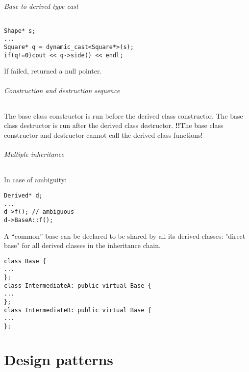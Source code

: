 \documentclass{article}
\newcommand{\caut}{\textbf{!!}}
\begin{document}
\paragraph{Base to derived type cast}
\begin{lstlisting}
Shape* s;
...
Square* q = dynamic_cast<Square*>(s);
if(q!=0)cout << q->side() << endl;
\end{lstlisting}
If failed, returned a null pointer.

\paragraph{Construction and destruction sequence}
The base class constructor is run
before the derived class constructor.
The base class destructor is run
after the derived class destructor.
\caut The base class constructor and destructor
cannot call the derived class functions!

\paragraph{Multiple inheritance}
In case of ambiguity:
\begin{lstlisting}
Derived* d;
...
d->f(); // ambiguous
d->BaseA::f();
\end{lstlisting}

A “common” base can be declared to be shared by all its 
derived classes: "direct base" for all derived
classes in the inheritance chain.
\begin{lstlisting}
class Base {
...
};
class IntermediateA: public virtual Base {
...
};
class IntermediateB: public virtual Base {
...
};
\end{lstlisting}


































\part{Design patterns}
\end{document}
